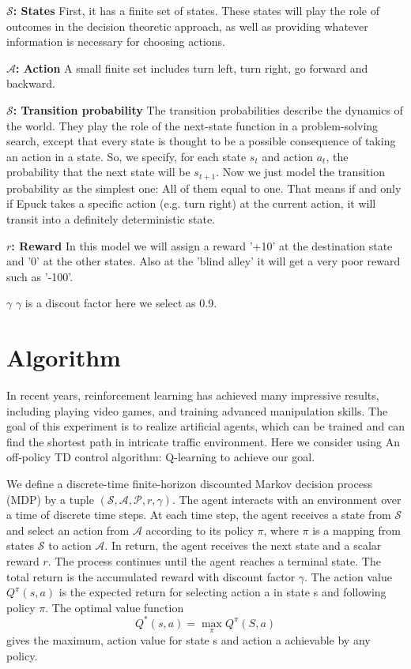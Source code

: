 \documentclass[a4paper, 11pt]{article} %
\begin{document}
\textbf{$\mathcal{S}$: States} First, it has a finite set of states. These states will play the role of outcomes in the decision theoretic approach, as well as providing whatever information is necessary for choosing actions. 

\textbf{$\mathcal{A}$: Action}
A small finite set includes turn left, turn right, go forward and backward.

\textbf{$\mathcal{S}$: Transition probability}
The transition probabilities describe the dynamics of the world. They play the role of the next-state function in a problem-solving search, except that every state is thought to be a possible consequence of taking an action in a state. So, we specify, for each state $s_{t}$ and action $a_{t}$, the probability that the next state will be $s_{t+1}$. 
Now we just model the transition probability as the simplest one: All of them equal to one. That means if and only if Epuck takes a specific action (e.g. turn right) at the current action, it will transit into a definitely deterministic state.

\textbf{$r$: Reward} In this model we will assign a reward '+10' at the destination state and '0' at the other states. 
Also at the 'blind alley' it will get a very poor reward such as '-100'.

\textbf{$\gamma$}  $\gamma$ is a discout factor here we select as 0.9.


\section{Algorithm}
In recent years, reinforcement learning has achieved many impressive results, including playing video games, and training advanced manipulation skills. The goal of this experiment is to realize artificial agents, which can be trained and can find the shortest path in intricate traffic environment. Here we consider using An off-policy TD control algorithm: Q-learning to achieve our goal.


We define a discrete-time finite-horizon discounted Markov decision process (MDP) by a tuple $(\mathcal{S,A,P}, r,\gamma)$. The agent interacts with an environment over a time of discrete time steps. At each time step, the agent receives a state from $\mathcal{S}$ and select an action from $\mathcal{A}$ according to its policy $\pi$, where $\pi$ is a mapping from states $\mathcal{S}$ to action $\mathcal{A}$. In return, the agent receives the next state and a scalar reward $r$. The process continues until the agent reaches a terminal state. The total return is the accumulated reward with discount factor $\gamma$. The action value $Q^{\pi}(s,a)$ is the expected return for selecting action a in state s and following policy $\pi$. The optimal value function $$Q^*(s,a)=\max \limits_{\pi}Q^{\pi}(S,a)$$ gives the maximum, action value for state s and action a achievable by any policy.
\end{document}

